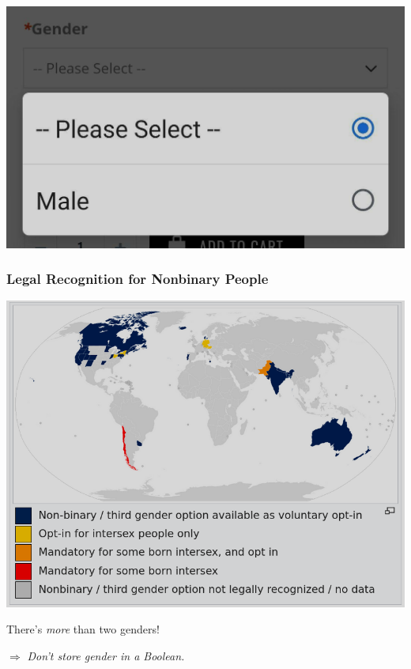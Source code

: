 \documentclass[aspectratio=169,x11names]{beamer}
\begin{document}
\begin{frame}
\begin{center}
\includegraphics[scale=0.3]{images/please_select_male.jpg} 
\end{center}
\end{frame}

\begin{frame}
\frametitle{Legal Recognition for Nonbinary People}
\begin{center}
\includegraphics[height=0.7\textheight,keepaspectratio]{images/legal_recognition.png} 
\end{center}
\end{frame}

\begin{frame}
\begin{center}
\huge
There's \emph{more} than two genders!\medskip

\Large
$\Rightarrow$ \emph{Don't store gender in a Boolean.}
\end{center}
\end{frame}
\end{document}
